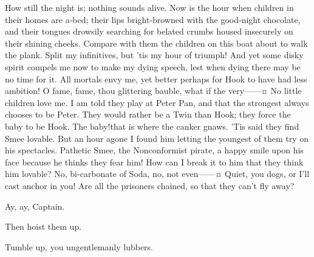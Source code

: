 \begin{drama}

How still the night is; nothing sounds alive.
Now is the hour when children in their homes are a‐bed;
their lips bright‐browned with the good‐night chocolate,
and their tongues drowsily searching for belated crumbs housed insecurely on their shining cheeks.
Compare with them the children on this boat about to walk the plank.
Split my infinitives, but ’tis my hour of triumph!
And yet some disky spirit compels me now to make my dying speech, lest when dying there may be no time for it.
All mortals envy me, yet better perhaps for Hook to have had less ambition!
O fame, fame, thou glittering bauble, what if the very——¤
No little children love me.
I am told they play at Peter Pan, and that the strongest always chooses to be Peter.
They would rather be a Twin than Hook; they force the baby to be Hook.
The baby!\@ that is where the canker gnaws.
’Tis said they find Smee lovable.
But an hour agone I found him letting the youngest of them try on his spectacles.
Pathetic Smee, the Nonconformist pirate, a happy smile upon his face because he thinks they fear him!
How can I break it to him that they think him lovable?
No, bi‐carbonate of Soda, no, not even——¤
Quiet, you dogs, or I’ll cast anchor in you!
Are all the prisoners chained, so that they can’t fly away?

\jukesspeaks
Ay, ay, Captain.

\hookspeaks
Then hoist them up.

Tumble up, you ungentlemanly lubbers.



\end{drama}
